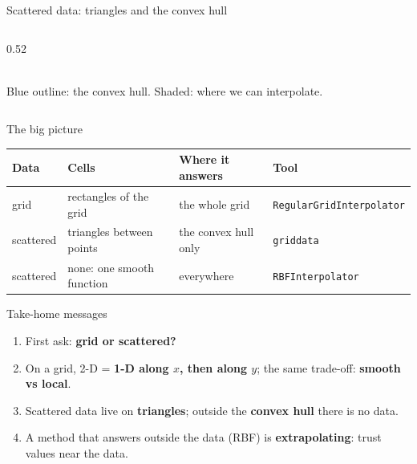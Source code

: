 \documentclass[aspectratio=169]{beamer}
\begin{document}
\begin{frame}{Scattered data: triangles and the convex hull}
\begin{columns}[c]
\begin{column}{0.52\textwidth}
\\[2pt]
\footnotesize Blue outline: the convex hull. Shaded: where we can interpolate.
\end{column}
\end{columns}
\end{frame}

\begin{frame}{The big picture}
\small
\centering
\setlength{\tabcolsep}{5pt}
\renewcommand{\arraystretch}{1.4}
\footnotesize
\begin{tabular}{llll}
\toprule
\textbf{Data} & \textbf{Cells} & \textbf{Where it answers} & \textbf{Tool} \\
\midrule
grid      & rectangles of the grid     & the whole grid       & \texttt{RegularGridInterpolator} \\
scattered & triangles between points   & the convex hull only & \texttt{griddata} \\
scattered & none: one smooth function  & everywhere           & \texttt{RBFInterpolator} \\
\bottomrule
\end{tabular}
\vspace{0.4cm}
\raggedright
\begin{block}{Take-home messages}
\footnotesize
\begin{enumerate}
  \setlength{\itemsep}{3pt}
  \item First ask: \textbf{grid or scattered?}
  \item On a grid, 2-D = \textbf{1-D along $x$, then along $y$}; the same trade-off: \textbf{smooth vs local}.
  \item Scattered data live on \textbf{triangles}; outside the \textbf{convex hull} there is no data.
  \item A method that answers outside the data (RBF) is \textbf{extrapolating}: trust values near the data.
\end{enumerate}
\end{block}
\end{frame}
\end{document}
